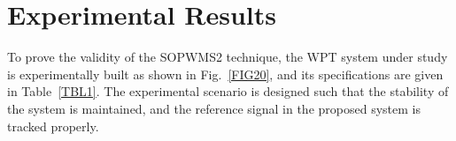 \documentclass[journal,a4paper,10pt,twoside]{IEEEtran} %
\begin{document}
	 
	 
	 
	 \section{Experimental Results}
	 To prove the validity of the SOPWMS2 technique, the WPT system under study is experimentally built as shown in Fig.~\ref{FIG20}, and its specifications are given in Table~\ref{TBL1}.
	 {\color{red}The experimental scenario is designed such that the stability of the system is maintained, and the reference signal in the proposed system is tracked properly.}
	 \begin{figure}
	    \begin{center}
	        \\
	                \vspace{-3mm}
\end{center}
\end{figure}
\end{document}
